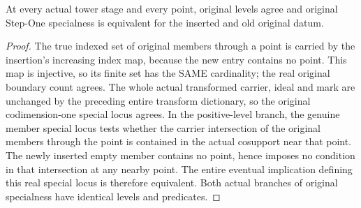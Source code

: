 \begin{lemma}
\label{hir:step-one-empty-insertion-special}
\leanok
At every actual tower stage and every point, original levels agree and original Step-One specialness is equivalent for the inserted and old original datum.
\end{lemma}
\begin{proof}
The true indexed set of original members through a point is carried by the insertion's increasing index map, because the new entry contains no point. This map is injective, so its finite set has the SAME cardinality; the real original boundary count agrees. The whole actual transformed carrier, ideal and mark are unchanged by the preceding entire transform dictionary, so the original codimension-one special locus agrees. In the positive-level branch, the genuine member special locus tests whether the carrier intersection of the original members through the point is contained in the actual cosupport near that point. The newly inserted empty member contains no point, hence imposes no condition in that intersection at any nearby point. The entire eventual implication defining this real special locus is therefore equivalent. Both actual branches of original specialness have identical levels and predicates.
\end{proof}

